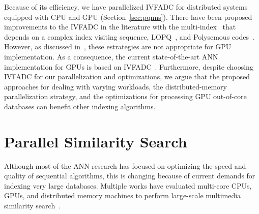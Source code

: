 Because of its efficiency, we have parallelized IVFADC 
for distributed systems equipped with CPU and GPU (Section~\ref{sec:pqnns}). There have been proposed improvements to the IVFADC in the literature
with the multi-index~\cite{6915715} that depends on a complex index visiting sequence, LOPQ~\cite{6909695}, and Polysemous codes~\cite{978-3-319-46475-6_48}. However, as discussed in~\cite{8733051}, these estrategies are not appropriate for GPU implementation. As a consequence,
the current state-of-the-art ANN implementation for GPUs is based on IVFADC~\cite{8733051}.
Furthermore, despite choosing IVFADC for our parallelization and optimizations, we argue that the proposed
approaches for dealing with varying workloads, the distributed-memory parallelization strategy, and
the optimizations for processing GPU out-of-core databases can benefit other indexing algorithms.

\section{Parallel Similarity Search}

Although most of the ANN research has focused on optimizing the speed and
quality of sequential algorithms, this is changing because of 
current demands for indexing very large databases. Multiple works have  evaluated
multi-core CPUs, GPUs, and distributed memory machines to perform large-scale multimedia similarity search~\cite{2398596,Stupar10rankreduce,Moise:2013,8733051,6267877,Krulis2012,7780592,6809191,2093973.2094002,Teodoro2014,ANDRADE201981}.

